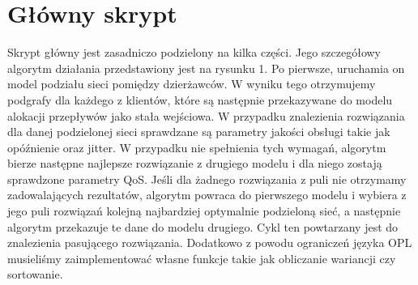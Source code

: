 \section{Główny skrypt}

Skrypt główny jest zasadniczo podzielony na kilka części. Jego szczegółowy algorytm działania przedstawiony
jest na rysunku 1. Po pierwsze, uruchamia on model podziału sieci pomiędzy dzierżawców.
W wyniku tego otrzymujemy podgrafy dla każdego z klientów, które są następnie przekazywane
do modelu alokacji przepływów jako stała wejściowa. W przypadku znalezienia rozwiązania
dla danej podzielonej sieci sprawdzane są parametry jakości obsługi takie jak opóźnienie
oraz jitter. W przypadku nie spełnienia tych wymagań, algorytm bierze następne najlepsze rozwiązanie z drugiego modelu i dla niego zostają sprawdzone
parametry QoS. Jeśli dla żadnego rozwiązania z puli nie otrzymamy zadowalających rezultatów,
algorytm powraca do pierwszego modelu i wybiera z jego puli rozwiązań kolejną najbardziej
optymalnie podzieloną sieć, a następnie algorytm przekazuje te dane do modelu drugiego.
Cykl ten powtarzany jest do znalezienia pasującego rozwiązania.
\newline \newline
Dodatkowo z powodu ograniczeń języka OPL musieliśmy zaimplementować własne funkcje
takie jak obliczanie wariancji czy sortowanie.
